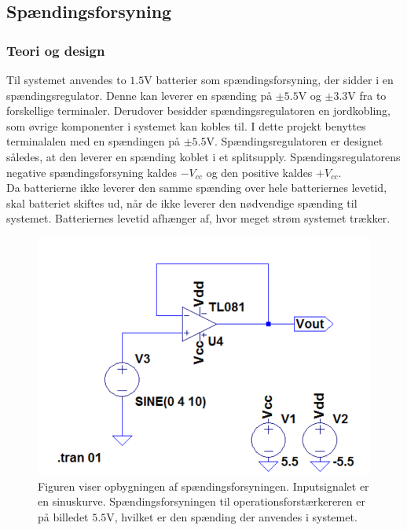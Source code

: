 \subsection{Spændingsforsyning}
\subsubsection{Teori og design}
Til systemet anvendes to $1.5$V batterier som spændingsforsyning, der sidder i en spændingsregulator. Denne kan leverer en spænding på $\pm5.5$V og $\pm3.3$V fra to forskellige terminaler. Derudover besidder spændingsregulatoren en jordkobling, som øvrige komponenter i systemet kan kobles til. I dette projekt benyttes terminalalen med en spændingen på $\pm5.5$V. Spændingsregulatoren er designet således, at den leverer en spænding koblet i et splitsupply. Spændingsregulatorens negative spændingsforsyning kaldes $-V_{cc}$ og den positive kaldes $+V_{cc}$. \\%
Da batterierne ikke leverer den samme spænding over hele batteriernes levetid, skal batteriet skiftes ud, når de ikke leverer den nødvendige spænding til systemet. Batteriernes levetid afhænger af, hvor meget strøm systemet trækker. %

\begin{figure}[H]
\centering
\includegraphics[scale=0.5]{figures/cProblemloesning/Spaendingsforsyning_LTspice.PNG}
\caption{Figuren viser opbygningen af spændingsforsyningen. Inputsignalet er en sinuskurve. Spændingsforsyningen til operationsforstærkereren er på billedet \pm$5.5$V, hvilket er den spænding der anvendes i systemet.}
\label{fig:spaendingsforsyning}
\end{figure}


